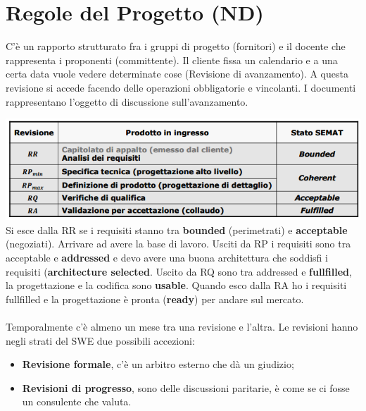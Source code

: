 



\section{Regole del Progetto (ND)}

C'è un rapporto strutturato fra i gruppi di progetto (fornitori) e il docente che rappresenta i proponenti (committente). Il cliente fissa un calendario e a una certa data vuole vedere determinate cose (Revisione di avanzamento). A questa revisione si accede facendo delle operazioni obbligatorie e vincolanti. I documenti rappresentano l'oggetto di discussione sull'avanzamento.

\includegraphics[width=0.75\columnwidth]{img1}
Si esce dalla RR se i requisiti stanno tra \textbf{bounded} (perimetrati) e \textbf{acceptable} (negoziati). Arrivare ad avere la base di lavoro. Usciti da RP i requisiti sono tra acceptable e \textbf{addressed} e devo avere una buona architettura che soddisfi i requisiti (\textbf{architecture selected}. Uscito da RQ sono tra addressed e \textbf{fullfilled}, la progettazione e la codifica sono \textbf{usable}. Quando esco dalla RA ho i requisiti fullfilled e la progettazione è pronta (\textbf{ready}) per andare sul mercato.\\\\

Temporalmente c'è almeno un mese tra una revisione e l'altra. Le revisioni hanno negli strati del SWE due possibili accezioni:

\begin{itemize}

	\item \textbf{Revisione formale}, c'è un arbitro esterno che dà un giudizio;
	\item \textbf{Revisioni di progresso}, sono delle discussioni paritarie, è come se ci fosse un consulente che valuta.

\end{itemize}

